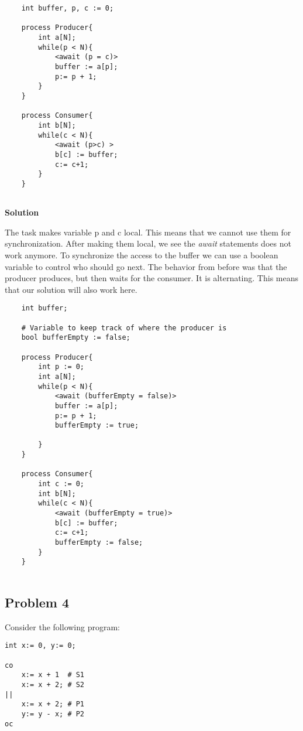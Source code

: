 \begin{lstlisting}
    int buffer, p, c := 0;

    process Producer{
        int a[N];
        while(p < N){
            <await (p = c)>
            buffer := a[p];
            p:= p + 1;
        }
    }

    process Consumer{
        int b[N];
        while(c < N){
            <await (p>c) >
            b[c] := buffer;
            c:= c+1;
        }
    }
    
\end{lstlisting}

\textbf{Solution}

The task makes variable p and c local. This means that we cannot use them for synchronization. 
After making them local, we see the \textit{await} statements does not work anymore. 
To synchronize the access to the buffer we can use a boolean variable to control who should go next. 
The behavior from before was that the producer produces, but then waits for the consumer. It is alternating.
This means that our solution will also work here. 


\begin{lstlisting}
    int buffer; 

    # Variable to keep track of where the producer is 
    bool bufferEmpty := false; 

    process Producer{
        int p := 0;
        int a[N];
        while(p < N){
            <await (bufferEmpty = false)>
            buffer := a[p];
            p:= p + 1;
            bufferEmpty := true; 
        
        }
    }

    process Consumer{
        int c := 0; 
        int b[N];
        while(c < N){
            <await (bufferEmpty = true)>
            b[c] := buffer;
            c:= c+1;
            bufferEmpty := false; 
        }
    }
    
\end{lstlisting}


\subsection{Problem 4}

Consider the following program:

\begin{lstlisting}
int x:= 0, y:= 0;

co 
    x:= x + 1  # S1
    x:= x + 2; # S2
||
    x:= x + 2; # P1
    y:= y - x; # P2
oc 
\end{lstlisting}


